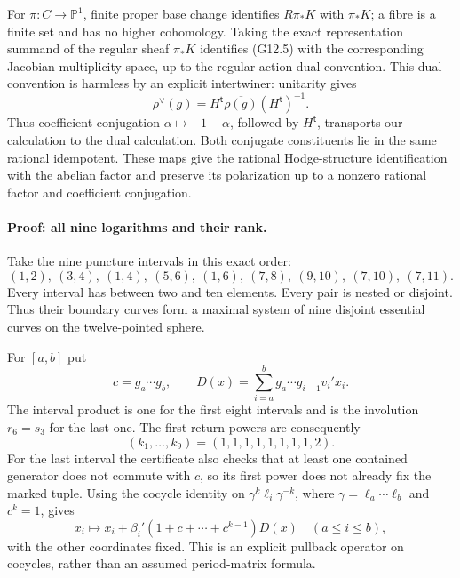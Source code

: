 For $\pi:C\to\mathbb P^1$, finite proper base change identifies
$R\pi_*K$ with $\pi_*K$; a fibre is a finite set and has no higher
cohomology. Taking the exact representation summand of the regular
sheaf $\pi_*K$ identifies (G12.5) with the corresponding Jacobian
multiplicity space, up to the regular-action dual convention.
This dual convention is harmless by an explicit intertwiner: unitarity
gives
\[
\rho^\vee(g)=H^{\mathsf t}\overline{\rho(g)}(H^{\mathsf t})^{-1}.
\tag{G12.6}
\]
Thus coefficient conjugation $\alpha\mapsto-1-\alpha$, followed by
$H^{\mathsf t}$, transports our calculation to the dual calculation.
Both conjugate constituents lie in the same rational idempotent.
These maps give the rational Hodge-structure identification with the
abelian factor and preserve its polarization up to a nonzero rational
factor and coefficient conjugation.

\paragraph{Proof: all nine logarithms and their rank.}
Take the nine puncture intervals in this exact order:
\[
(1,2),\ (3,4),\ (1,4),\ (5,6),\ (1,6),\
(7,8),\ (9,10),\ (7,10),\ (7,11).
\tag{G12.7}
\]
Every interval has between two and ten elements. Every pair is
nested or disjoint. Thus their boundary curves form a maximal
system of nine disjoint essential curves on the twelve-pointed sphere.

For $[a,b]$ put
\[
c=g_a\cdots g_b,\qquad
D(x)=\sum_{i=a}^b g_a\cdots g_{i-1}v_i'x_i.
\]
The interval product is one for the first eight intervals and is
the involution $r_6=s_3$ for the last one. The first-return powers
are consequently
\[
(k_1,\ldots,k_9)=(1,1,1,1,1,1,1,1,2).
\tag{G12.8}
\]
For the last interval the certificate also checks that at least one
contained generator does not commute with $c$, so its first power
does not already fix the marked tuple.
Using the cocycle identity on
$\gamma^k\ell_i\gamma^{-k}$, where
$\gamma=\ell_a\cdots\ell_b$ and $c^k=1$, gives
\[
x_i\longmapsto x_i+
\beta_i'(1+c+\cdots+c^{k-1})D(x)\quad(a\le i\le b),
\tag{G12.9}
\]
with the other coordinates fixed. This is an explicit pullback
operator on cocycles, rather than an assumed period-matrix formula.


